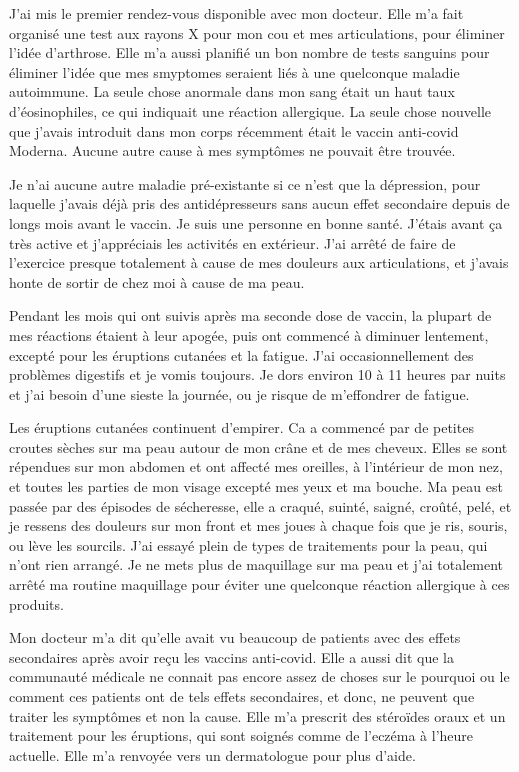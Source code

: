 {J'ai mis le premier rendez-vous disponible avec mon docteur. Elle m'a fait
organisé une test aux rayons X pour mon cou et mes articulations, pour éliminer
l'idée d'arthrose. Elle m'a aussi planifié un bon nombre de tests sanguins pour
éliminer l'idée que mes smyptomes seraient liés à une quelconque maladie
autoimmune. La seule chose anormale dans mon sang était un haut taux
d'éosinophiles, ce qui indiquait une réaction allergique. La seule chose
nouvelle que j'avais introduit dans mon corps récemment était le vaccin
anti-covid Moderna. Aucune autre cause à mes symptômes ne pouvait être trouvée.

Je n'ai aucune autre maladie pré-existante si ce n'est que la dépression, pour
laquelle j'avais déjà pris des antidépresseurs sans aucun effet secondaire
depuis de longs mois avant le vaccin. Je suis une personne en bonne
santé. J'étais avant ça très active et j'appréciais les activités en
extérieur. J'ai arrêté de faire de l'exercice presque totalement à cause de mes
douleurs aux articulations, et j'avais honte de sortir de chez moi à cause de ma
peau.

Pendant les mois qui ont suivis après ma seconde dose de vaccin, la plupart de
mes réactions étaient à leur apogée, puis ont commencé à diminuer lentement,
excepté pour les éruptions cutanées et la fatigue. J'ai occasionnellement des
problèmes digestifs et je vomis toujours. Je dors environ 10 à 11 heures par
nuits et j'ai besoin d'une sieste la journée, ou je risque de m'effondrer de
fatigue.

Les éruptions cutanées continuent d'empirer. Ca a commencé par de petites
croutes sèches sur ma peau autour de mon crâne et de mes cheveux. Elles se sont
répendues sur mon abdomen et ont affecté mes oreilles, à l'intérieur de mon nez,
et toutes les parties de mon visage excepté mes yeux et ma bouche. Ma peau est
passée par des épisodes de sécheresse, elle a craqué, suinté, saigné, croûté,
pelé, et je ressens des douleurs sur mon front et mes joues à chaque fois que je
ris, souris, ou lève les sourcils. J'ai essayé plein de types de traitements
pour la peau, qui n'ont rien arrangé. Je ne mets plus de maquillage sur ma peau
et j'ai totalement arrêté ma routine maquillage pour éviter une quelconque
réaction allergique à ces produits.

Mon docteur m'a dit qu'elle avait vu beaucoup de patients avec des effets
secondaires après avoir reçu les vaccins anti-covid. Elle a aussi dit que la
communauté médicale ne connait pas encore assez de choses sur le pourquoi ou le
comment ces patients ont de tels effets secondaires, et donc, ne peuvent que
traiter les symptômes et non la cause. Elle m'a prescrit des stéroïdes oraux et
un traitement pour les éruptions, qui sont soignés comme de l'eczéma à l'heure
actuelle. Elle m'a renvoyée vers un dermatologue pour plus d'aide.

}
